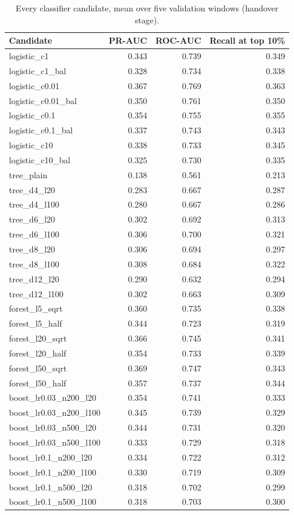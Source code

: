 \begin{table}[H]
\centering\small
\caption{Every classifier candidate, mean over five validation windows (handover stage).}
\label{tab:app-classifier}
\begin{tabular}{@{}lrrr@{}}
\toprule
Candidate & PR-AUC & ROC-AUC & Recall at top 10\% \\
\midrule
logistic\_c1 & 0.343 & 0.739 & 0.349 \\
logistic\_c1\_bal & 0.328 & 0.734 & 0.338 \\
logistic\_c0.01 & 0.367 & 0.769 & 0.363 \\
logistic\_c0.01\_bal & 0.350 & 0.761 & 0.350 \\
logistic\_c0.1 & 0.354 & 0.755 & 0.355 \\
logistic\_c0.1\_bal & 0.337 & 0.743 & 0.343 \\
logistic\_c10 & 0.338 & 0.733 & 0.345 \\
logistic\_c10\_bal & 0.325 & 0.730 & 0.335 \\
tree\_plain & 0.138 & 0.561 & 0.213 \\
tree\_d4\_l20 & 0.283 & 0.667 & 0.287 \\
tree\_d4\_l100 & 0.280 & 0.667 & 0.286 \\
tree\_d6\_l20 & 0.302 & 0.692 & 0.313 \\
tree\_d6\_l100 & 0.306 & 0.700 & 0.321 \\
tree\_d8\_l20 & 0.306 & 0.694 & 0.297 \\
tree\_d8\_l100 & 0.308 & 0.684 & 0.322 \\
tree\_d12\_l20 & 0.290 & 0.632 & 0.294 \\
tree\_d12\_l100 & 0.302 & 0.663 & 0.309 \\
forest\_l5\_sqrt & 0.360 & 0.735 & 0.338 \\
forest\_l5\_half & 0.344 & 0.723 & 0.319 \\
forest\_l20\_sqrt & 0.366 & 0.745 & 0.341 \\
forest\_l20\_half & 0.354 & 0.733 & 0.339 \\
forest\_l50\_sqrt & 0.369 & 0.747 & 0.343 \\
forest\_l50\_half & 0.357 & 0.737 & 0.344 \\
boost\_lr0.03\_n200\_l20 & 0.354 & 0.741 & 0.333 \\
boost\_lr0.03\_n200\_l100 & 0.345 & 0.739 & 0.329 \\
boost\_lr0.03\_n500\_l20 & 0.344 & 0.731 & 0.320 \\
boost\_lr0.03\_n500\_l100 & 0.333 & 0.729 & 0.318 \\
boost\_lr0.1\_n200\_l20 & 0.334 & 0.722 & 0.312 \\
boost\_lr0.1\_n200\_l100 & 0.330 & 0.719 & 0.309 \\
boost\_lr0.1\_n500\_l20 & 0.318 & 0.702 & 0.299 \\
boost\_lr0.1\_n500\_l100 & 0.318 & 0.703 & 0.300 \\
\bottomrule
\end{tabular}
\end{table}